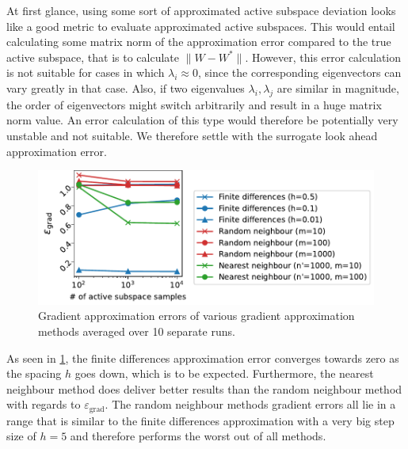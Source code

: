 \documentclass[
  a4paper,  %
  twoside,  %
  bibliography=totoc,
  headsepline,
  cleardoublepage=empty,
  parskip=half,
  draft=false
]{scrbook}
\begin{document}
At first glance, using some sort of approximated active subspace deviation looks like a good metric to evaluate approximated active subspaces.
This would entail calculating some matrix norm of the approximation error compared to the true active subspace, that is to calculate $\| W - W^\ast \|$.
However, this error calculation is not suitable for cases in which $\lambda_i \approx 0$, since the corresponding eigenvectors can vary greatly in that case.
Also, if two eigenvalues $\lambda_i, \lambda_j$ are similar in magnitude, the order of eigenvectors might switch arbitrarily and result in a huge matrix norm value.
An error calculation of this type would therefore be potentially very unstable and not suitable.
We therefore settle with the surrogate look ahead approximation error.

\begin{mdframed}[style=style]
\begin{figure}[H]
	\includegraphics[width=\textwidth]{graphics/ishigami_as_grad_errors}
\delimit
	\caption{Gradient approximation errors of various gradient approximation methods averaged over 10 separate runs.}
	\label{fig:ishigami_as_grad}
\end{figure}
\end{mdframed}
%
As seen in \cref{fig:ishigami_as_grad}, the finite differences approximation error converges towards zero as the spacing $h$ goes down, which is to be expected.
Furthermore, the nearest neighbour method does deliver better results than the random neighbour method with regards to $\varepsilon_{\mathrm{grad}}$.
The random neighbour methods gradient errors all lie in a range that is similar to the finite differences approximation with a very big step size of $h=5$ and therefore performs the worst out of all methods.
\end{document}
